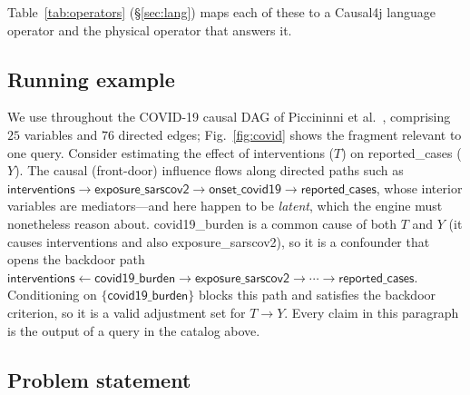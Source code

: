 Table~\ref{tab:operators} (\S\ref{sec:lang}) maps each of these to a Causal4j
language operator and the physical operator that answers it.

\subsection{Running example}\label{sec:bg:example}

We use throughout the COVID-19 causal DAG of Piccininni et
al.~\cite{piccininni2020covid}, comprising $25$ variables and $76$ directed
edges; Fig.~\ref{fig:covid} shows the fragment relevant to one query. Consider
estimating the effect of \textsf{interventions} ($T$) on
\textsf{reported\_cases} ($Y$). The causal (front-door) influence flows along
directed paths such as
$\textsf{interventions}\!\rightarrow\!\textsf{exposure\_sarscov2}\!\rightarrow\!
\textsf{onset\_covid19}\!\rightarrow\!\textsf{reported\_cases}$, whose interior
variables are mediators---and here happen to be \emph{latent}, which the engine
must nonetheless reason about. \textsf{covid19\_burden} is a common cause of both
$T$ and $Y$ (it causes \textsf{interventions} and also
\textsf{exposure\_sarscov2}), so it is a confounder that opens the backdoor path
$\textsf{interventions}\!\leftarrow\!\textsf{covid19\_burden}\!\rightarrow\!
\textsf{exposure\_sarscov2}\!\rightarrow\!\cdots\!\rightarrow\!\textsf{reported\_cases}$.
Conditioning on $\{\textsf{covid19\_burden}\}$ blocks this path and satisfies the
backdoor criterion, so it is a valid adjustment set for $T\!\rightarrow\!Y$. Every
claim in this paragraph is the output of a query in the catalog above.

\subsection{Problem statement}\label{sec:bg:problem}

